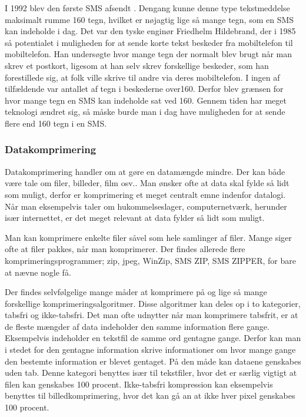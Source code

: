 I 1992 blev den første SMS afsendt \cite{museum}. Dengang kunne denne type tekstmeddelse maksimalt rumme 160 tegn, hvilket er nøjagtig lige så mange tegn, som en SMS kan indeholde i dag. Det var den tyske enginør Friedhelm Hildebrand, der i 1985 så potentialet i muligheden for at sende korte tekst beskeder fra mobiltelefon til mobiltelefon. Han undersøgte hvor mange tegn der normalt blev brugt når man skrev et postkort, ligesom at han selv skrev forskellige beskeder, som han forestillede sig, at folk ville skrive til andre via deres mobiltelefon. I ingen af tilfældende var antallet af tegn i beskederne over160. Derfor blev grænsen for hvor mange tegn en SMS kan indeholde sat ved 160.
Gennem tiden har meget teknologi ændret sig, så måske burde man i dag have muligheden for at sende flere end 160 tegn i en SMS. \cite{hillebrand}

\subsubsection {Datakomprimering}

Datakomprimering handler om at gøre en datamængde mindre. Der kan både være tale om filer, billeder, film osv.. Man ønsker ofte at data skal fylde så lidt som muligt, derfor er komprimering et meget centralt emne indenfor datalogi. Når man eksempelvis taler om hukommelseslager, computernetværk, herunder især internettet, er det meget relevant at data fylder så lidt som muligt.
 
Man kan komprimere enkelte filer såvel som hele samlinger af filer. Mange siger ofte at filer pakkes, når man komprimerer. Der findes allerede flere komprimeringsprogrammer; zip, jpeg, WinZip, SMS ZIP, SMS ZIPPER, for bare at nævne nogle få.

Der findes selvfølgelige mange måder at komprimere på og lige så mange forskellige komprimeringsalgoritmer. Disse algoritmer kan deles op i to kategorier, tabsfri og ikke-tabsfri.  
Det man ofte udnytter når man komprimere tabsfrit, er at de fleste mængder af data indeholder den samme information flere gange. Eksempelvis indeholder en tekstfil de samme ord gentagne gange. Derfor kan man i stedet for den gentagne information skrive informationer om hvor mange gange den bestemte information er blevet gentaget. På den måde kan dataene genskabes uden tab. Denne kategori benyttes især til tekstfiler, hvor det er særlig vigtigt at filen kan genskabes 100 procent. Ikke-tabsfri kompression kan eksempelvis benyttes til billedkomprimering, hvor det kan gå an at ikke hver pixel genskabes 100 procent.